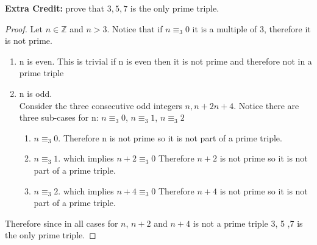 \documentclass{article}
\newcommand{\Z}{\mathbb{Z}}
\begin{document}
	\textbf{Extra Credit:}
		prove that $3, 5, 7$ is the only prime triple.
		\begin{proof}
			Let $n\in \Z$ and $n > 3$. Notice that if $n \equiv_3 0 $ it is a multiple of 3, therefore it is not prime.
			\begin{enumerate}[label= Case \arabic*:]
				\item n is even. This is trivial if n is even then it is not prime and therefore not in a prime triple
				\item n is odd. \\  
				Consider the three consecutive odd integers $n, n+2 n+4$. Notice there are three sub-cases for n: $n \equiv_3 0$, $n \equiv_3 1$, $n \equiv_3 2$
				\begin{enumerate}[label= Subcase \arabic*:]
				\item $n \equiv_3 0$. Therefore n is not prime so it is not part of a prime triple.
				\item $n \equiv_3 1$. which implies $n+2 \equiv_3 0$ Therefore $n+2$ is not prime so it is not part of a prime triple.
				\item $n \equiv_3 2$. which implies $n+4 \equiv_3 0$ Therefore $n+4$ is not prime so it is not part of a prime triple.
				\end{enumerate}	
			\end{enumerate}
			Therefore since in all cases for $n$, $n+2$ and $n+4$ is not a prime triple 3, 5 ,7 is the only prime triple.
			
		\end{proof}
			
\end{document}
